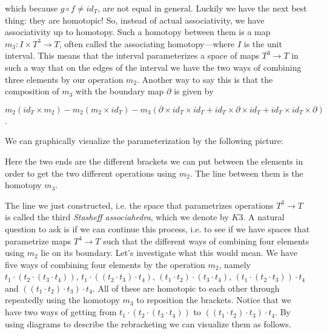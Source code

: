which because $ g\circ f \neq id_T$, are not equal in general. Luckily we have the next best thing: they are homotopic! So, instead of actual associativity, we have associativity up to homotopy. Such a homotopy between them is a map $ m_3:I\times T^3\longrightarrow T$, often called the associating homotopy---where $ I$ is the unit interval. This means that the interval parameterizes a space of maps $ T^3\longrightarrow T$ in such a way that on the edges of the interval we have the two ways of combining three elements by our operation $ m_2$. Another way to say this is that the composition of $ m_3$ with the boundary map $ \partial$ is given by 

$ m_2(id_T\times m_2) - m_2(m_2 \times id_T) - m_3(\partial \times id_T \times id_T + id_T\times \partial \times id_T + id_T\times id_T\times \partial )$.

We can graphically visualize the parameterization by the following picture:

\begin{center}
\def\svgwidth{0.6\textwidth}

\end{center}


Here the two ends are the different brackets we can put between the elements in order to get the two different operations using $ m_2$. The line between them is the homotopy $m_3$.

The line we just constructed, i.e. the space that parametrizes operations $ T^3\longrightarrow T$ is called the third \emph{Stasheff associahedra}, which we denote by $K3$. A natural question to ask is if we can continue this process, i.e. to see if we have spaces that parametrize maps $T^4\longrightarrow T$ such that the different ways of combining four elements using $m_2$ lie on its boundary. Let's investigate what this would mean. We have five ways of combining four elements by the operation $ m_2$, namely $ t_1 \cdot (t_2 \cdot (t_3 \cdot t_4))$, $ t_1 \cdot ((t_2 \cdot t_3) \cdot t_4)$, $ (t_1 \cdot t_2) \cdot (t_3 \cdot t_4)$, $ (t_1 \cdot (t_2 \cdot t_3)) \cdot t_4$ and $ ((t_1 \cdot t_2) \cdot t_3) \cdot t_4$. All of these are homotopic to each other through repeatedly using the homotopy $m_3$ to reposition the brackets. Notice that we have two ways of getting from $ t_1 \cdot (t_2 \cdot (t_3 \cdot t_4))$ to $ ((t_1 \cdot t_2) \cdot t_3) \cdot t_4$. By using diagrams to describe the rebracketing we can visualize them as follows.

\begin{center}
\def\svgwidth{0.6\textwidth}

\end{center}

